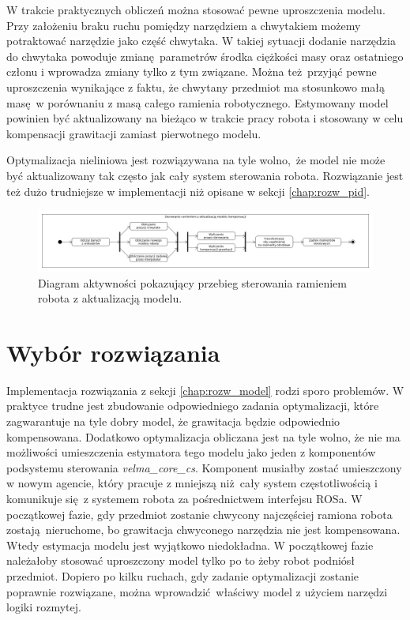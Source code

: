 W trakcie praktycznych obliczeń można stosować pewne uproszczenia modelu. Przy założeniu braku ruchu pomiędzy narzędziem a chwytakiem możemy potraktować narzędzie jako część chwytaka. W takiej sytuacji dodanie narzędzia do chwytaka powoduje zmianę parametrów środka ciężkości masy oraz ostatniego członu i wprowadza zmiany tylko z tym związane. Można też przyjąć pewne uproszczenia wynikające z faktu, że chwytany przedmiot ma stosunkowo małą masę w porównaniu z masą całego ramienia robotycznego. Estymowany model powinien być aktualizowany na bieżąco w trakcie pracy robota i stosowany w celu kompensacji grawitacji zamiast pierwotnego modelu.

Optymalizacja nieliniowa jest rozwiązywana na tyle wolno, że model nie może być aktualizowany tak często jak cały system sterowania robota. Rozwiązanie jest też dużo trudniejsze w implementacji niż opisane w sekcji \ref{chap:rozw_pid}. 

\begin{figure}
	\centering
	\includegraphics[width=.99\textwidth]{images/komp_model.png}
	\caption{Diagram aktywności pokazujący przebieg sterowania ramieniem robota z aktualizacją modelu.}
	\label{fig:kompensacja}
\end{figure}

\section{Wybór rozwiązania}

Implementacja rozwiązania z sekcji \ref{chap:rozw_model} rodzi sporo problemów. W praktyce trudne jest zbudowanie odpowiedniego zadania optymalizacji, które zagwarantuje na tyle dobry model, że grawitacja będzie odpowiednio kompensowana. Dodatkowo optymalizacja obliczana jest na tyle wolno, że nie ma możliwości umieszczenia estymatora tego modelu jako jeden z komponentów podsystemu sterowania \textit{velma\_core\_cs}. Komponent musiałby zostać umieszczony w nowym agencie, który pracuje z mniejszą niż cały system częstotliwością i komunikuje się z systemem robota za pośrednictwem interfejsu ROSa. W początkowej fazie, gdy przedmiot zostanie chwycony najczęściej ramiona robota zostają nieruchome, bo grawitacja chwyconego narzędzia nie jest kompensowana. Wtedy estymacja modelu jest wyjątkowo niedokładna. W początkowej fazie należałoby stosować uproszczony model tylko po to żeby robot podniósł przedmiot. Dopiero po kilku ruchach, gdy zadanie optymalizacji zostanie poprawnie rozwiązane, można wprowadzić właściwy model z użyciem narzędzi logiki rozmytej.

